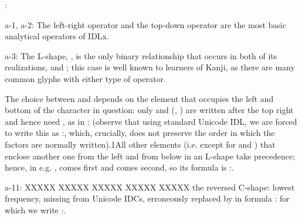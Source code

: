 \vspace{\myLineheight}\begin{multicols}{2}:

{\mktsStyleBold{}a-1}, {\mktsStyleBold{}a-2}: The left-right operator \cjkgGlue{} and the top-down operator \cjkgGlue{}
are the most basic analytical operators of IDLx.

{\mktsStyleBold{}a-3}: The L-shape, \cjkgGlue{}, is the only binary relationship that occurs in both of
its realizations, \cjkgGlue{} and \cjkgGlue{}; this case is well known to learners of Kanji, as
there are many common glyphs with either type of operator.

The choice between \cjkgGlue{} and \cjkgGlue{} depends on the element that occupies the left and bottom of the character in
question: only \cjkgGlue{} and \cjkgGlue{} (\cjkgGlue{}, \cjkgGlue{}) are written {\mktsStyleItalic{}after\/} the top right and hence
need \cjkgGlue{}, as in \cjkgGlue{}:\cjkgGlue{} (observe that using standard Unicode IDL, we are forced to write
this as
\cjkgGlue{}:\cjkgGlue{}\cjkgGlue{}, which,
crucially, does not preserve the order in which the factors are normally written).{\mktsEnStyleMarkMain{}1}All other elements (i.e. except for \cjkgGlue{} and \cjkgGlue{}) that enclose another one from the left and
from below in an L-shape take precedence; hence, in e.g. \cjkgGlue{}, \cjkgGlue{} comes first and \cjkgGlue{}
comes second, so its formula is \cjkgGlue{}:\cjkgGlue{}\cjkgGlue{}.

{\mktsStyleBold{}a-11}: XXXXX XXXXX XXXXX XXXXX XXXXX the reversed C-shape: lowest frequency, missing from Unicode IDCs,
erroneously replaced by \cjkgGlue{} in formula
\cjkgGlue{}:\cjkgGlue{}\cjkgGlue{} for which we write \cjkgGlue{}:\cjkgGlue{}\cjkgGlue{}.


\end{multicols}
